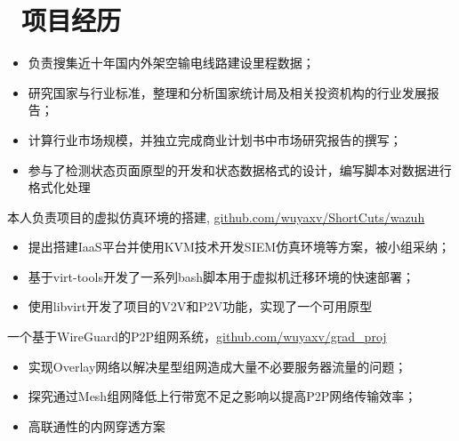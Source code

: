 \documentclass{resume}
\begin{document}
\section{\faUsers\ 项目经历}
\begin{itemize}
  \item 负责搜集近十年国内外架空输电线路建设里程数据；
  \item 研究国家与行业标准，整理和分析国家统计局及相关投资机构的行业发展报告；
  \item 计算行业市场规模，并独立完成商业计划书中市场研究报告的撰写；
  \item 参与了检测状态页面原型的开发和状态数据格式的设计，编写脚本对数据进行格式化处理
\end{itemize}
本人负责项目的虚拟仿真环境的搭建, \href{https://github.com/wuyaxv/ShortCuts/wazuh}{github.com/wuyaxv/ShortCuts/wazuh}
\begin{itemize}
  \item 提出搭建IaaS平台并使用KVM技术开发SIEM仿真环境等方案，被小组采纳；
  \item 基于virt-tools开发了一系列bash脚本用于虚拟机迁移环境的快速部署；
  \item 使用libvirt开发了项目的V2V和P2V功能，实现了一个可用原型
\end{itemize}

一个基于WireGuard的P2P组网系统，\href{https://github.com/wuyaxv/grad_proj}{github.com/wuyaxv/grad\_proj}
\begin{itemize}
  \item 实现Overlay网络以解决星型组网造成大量不必要服务器流量的问题；
  \item 探究通过Mesh组网降低上行带宽不足之影响以提高P2P网络传输效率；
  \item 高联通性的内网穿透方案
\end{itemize}

\end{document}

